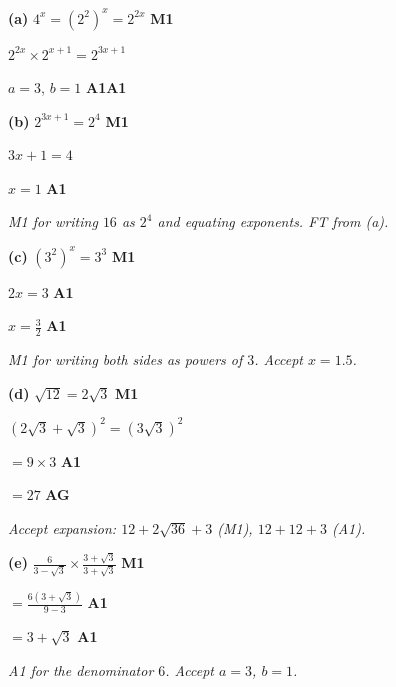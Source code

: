 \documentclass[12pt, twoside]{article}
\begin{document}
\begin{enumerate}[itemsep=0.3cm]
\textbf{(a)} $4^{x} = \left(2^{2}\right)^{x} = 2^{2x}$ \hfill \textbf{M1}

$2^{2x} \times 2^{x + 1} = 2^{3x + 1}$

$a = 3$, \quad $b = 1$ \hfill \textbf{A1A1}

\textbf{(b)} $2^{3x + 1} = 2^{4}$ \hfill \textbf{M1}

$3x + 1 = 4$

$x = 1$ \hfill \textbf{A1}

\emph{M1 for writing $16$ as $2^{4}$ and equating exponents. FT from (a).}

\textbf{(c)} $\left(3^{2}\right)^{x} = 3^{3}$ \hfill \textbf{M1}

$2x = 3$ \hfill \textbf{A1}

$x = \frac{3}{2}$ \hfill \textbf{A1}

\emph{M1 for writing both sides as powers of $3$. Accept $x = 1.5$.}

\textbf{(d)} $\sqrt{12} = 2\sqrt{3}$ \hfill \textbf{M1}

$\left(2\sqrt{3} + \sqrt{3}\right)^{2} = \left(3\sqrt{3}\right)^{2}$

$= 9 \times 3$ \hfill \textbf{A1}

$= 27$ \hfill \textbf{AG}

\emph{Accept expansion: $12 + 2\sqrt{36} + 3$ (M1), $12 + 12 + 3$ (A1).}

\textbf{(e)} $\frac{6}{3 - \sqrt{3}} \times \frac{3 + \sqrt{3}}{3 + \sqrt{3}}$ \hfill \textbf{M1}

$= \frac{6\left(3 + \sqrt{3}\right)}{9 - 3}$ \hfill \textbf{A1}

$= 3 + \sqrt{3}$ \hfill \textbf{A1}

\emph{A1 for the denominator $6$. Accept $a = 3$, $b = 1$.}

\end{enumerate}
\end{document}
